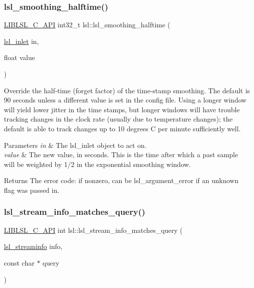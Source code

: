 \subsubsection{\texorpdfstring{lsl\+\_\+smoothing\+\_\+halftime()}{lsl\_smoothing\_halftime()}}
{\footnotesize\ttfamily \hyperlink{lsl__cpp_8h_aafd0ef1813e8be84a1420c4f1df64615}{L\+I\+B\+L\+S\+L\+\_\+\+C\+\_\+\+A\+PI} int32\+\_\+t lsl\+::lsl\+\_\+smoothing\+\_\+halftime (\begin{DoxyParamCaption}\item[{\hyperlink{namespacelsl_a884a3363cfcba75d7ce8f00c1c4c54f1}{lsl\+\_\+inlet}}]{in,  }\item[{float}]{value }\end{DoxyParamCaption})}

Override the half-\/time (forget factor) of the time-\/stamp smoothing. The default is 90 seconds unless a different value is set in the config file. Using a longer window will yield lower jitter in the time stamps, but longer windows will have trouble tracking changes in the clock rate (usually due to temperature changes); the default is able to track changes up to 10 degrees C per minute sufficiently well. 
\begin{DoxyParams}{Parameters}
{\em in} & The lsl\+\_\+inlet object to act on. \\
\hline
{\em value} & The new value, in seconds. This is the time after which a past sample will be weighted by 1/2 in the exponential smoothing window. \\
\hline
\end{DoxyParams}
\begin{DoxyReturn}{Returns}
The error code\+: if nonzero, can be lsl\+\_\+argument\+\_\+error if an unknown flag was passed in. 
\end{DoxyReturn}
\mbox{\label{namespacelsl_a5c10ba1783b34bd0b3f048ac4cb5fe5e}} 
\subsubsection{\texorpdfstring{lsl\+\_\+stream\+\_\+info\+\_\+matches\+\_\+query()}{lsl\_stream\_info\_matches\_query()}}
{\footnotesize\ttfamily \hyperlink{lsl__cpp_8h_aafd0ef1813e8be84a1420c4f1df64615}{L\+I\+B\+L\+S\+L\+\_\+\+C\+\_\+\+A\+PI} int lsl\+::lsl\+\_\+stream\+\_\+info\+\_\+matches\+\_\+query (\begin{DoxyParamCaption}\item[{\hyperlink{namespacelsl_aa0a9ce9956061679949daa2e35aae2e8}{lsl\+\_\+streaminfo}}]{info,  }\item[{const char $\ast$}]{query }\end{DoxyParamCaption})}

